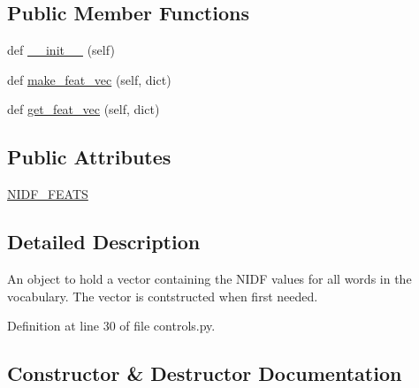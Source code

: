 \subsection*{Public Member Functions}
\begin{DoxyCompactItemize}
\item 
def \hyperlink{classcontrollable__seq2seq_1_1controls_1_1NIDFFeats_aabbf4d45ad69ae9e2f4fad849f946a14}{\+\_\+\+\_\+init\+\_\+\+\_\+} (self)
\item 
def \hyperlink{classcontrollable__seq2seq_1_1controls_1_1NIDFFeats_a3496ec1cf7d5c7284e420585be7767e2}{make\+\_\+feat\+\_\+vec} (self, dict)
\item 
def \hyperlink{classcontrollable__seq2seq_1_1controls_1_1NIDFFeats_a4459af283d40b0a2818ca204a8056029}{get\+\_\+feat\+\_\+vec} (self, dict)
\end{DoxyCompactItemize}
\subsection*{Public Attributes}
\begin{DoxyCompactItemize}
\item 
\hyperlink{classcontrollable__seq2seq_1_1controls_1_1NIDFFeats_a1f71352a29e9ef0b1a1ee288d64614cd}{N\+I\+D\+F\+\_\+\+F\+E\+A\+TS}
\end{DoxyCompactItemize}


\subsection{Detailed Description}
\begin{DoxyVerb}An object to hold a vector containing the NIDF values for all words in the
vocabulary. The vector is contstructed when first needed.
\end{DoxyVerb}
 

Definition at line 30 of file controls.\+py.



\subsection{Constructor \& Destructor Documentation}
\mbox{\label{classcontrollable__seq2seq_1_1controls_1_1NIDFFeats_aabbf4d45ad69ae9e2f4fad849f946a14}} 
